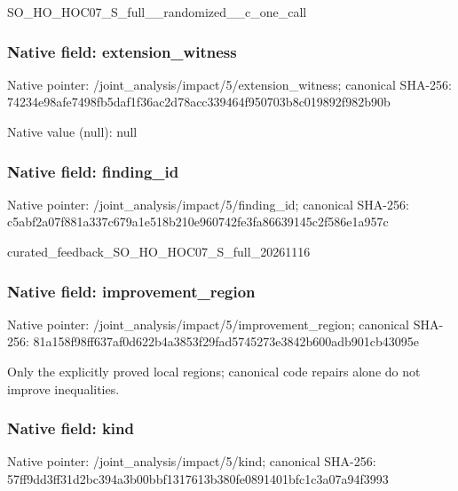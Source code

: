 \documentclass[10pt,a4paper]{article}
\begin{document}
\begingroup\raggedright\sloppy SO\_\allowbreak{}HO\_\allowbreak{}HOC07\_\allowbreak{}S\_\allowbreak{}full\_\allowbreak{}\_\allowbreak{}randomized\_\allowbreak{}\_\allowbreak{}c\_\allowbreak{}one\_\allowbreak{}call\par\endgroup

\subsubsection{Native field: extension\_\allowbreak{}witness}
Native pointer: /joint\_\allowbreak{}analysis/impact/5/extension\_\allowbreak{}witness; canonical SHA-256: 74234e98afe7498fb5daf1f36ac2d78acc339464f950703b8c019892f982b90b

Native value (null): null

\subsubsection{Native field: finding\_\allowbreak{}id}
Native pointer: /joint\_\allowbreak{}analysis/impact/5/finding\_\allowbreak{}id; canonical SHA-256: c5abf2a07f881a337c679a1e518b210e960742fe3fa86639145c2f586e1a957c

\begingroup\raggedright\sloppy curated\_\allowbreak{}feedback\_\allowbreak{}SO\_\allowbreak{}HO\_\allowbreak{}HOC07\_\allowbreak{}S\_\allowbreak{}full\_\allowbreak{}20261116\par\endgroup

\subsubsection{Native field: improvement\_\allowbreak{}region}
Native pointer: /joint\_\allowbreak{}analysis/impact/5/improvement\_\allowbreak{}region; canonical SHA-256: 81a158f98ff637af0d622b4a3853f29fad5745273e3842b600adb901cb43095e

\begingroup\raggedright\sloppy Only the explicitly proved local regions;\allowbreak{} canonical code repairs alone do not improve inequalities.\par\endgroup

\subsubsection{Native field: kind}
Native pointer: /joint\_\allowbreak{}analysis/impact/5/kind; canonical SHA-256: 57ff9dd3ff31d2bc394a3b00bbf1317613b380fe0891401bfc1c3a07a94f3993
\end{document}

